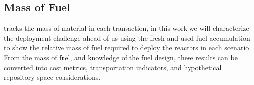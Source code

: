\subsection{Mass of Fuel}
\label{sec:mass_of_fuel}

\cyclus tracks the mass of material in each transaction, in this work we will characterize the deployment challenge ahead of us using the fresh and used fuel accumulation to show the relative mass of fuel required to deploy the reactors in each scenario. From the mass of fuel, and knowledge of the fuel design, these results can be converted into cost metrics, transportation indicators, and hypothetical repository space considerations.